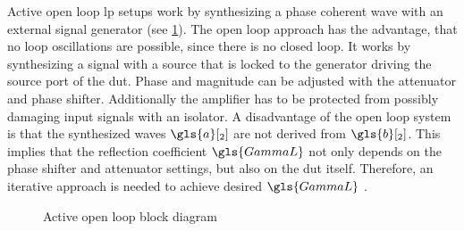 \documentclass[12pt,a4paper,parskip=full,abstract=true,BCOR=12mm]{scrreprt}
\begin{document}
Active open loop \gls{lp} setups work by synthesizing a phase coherent wave with
an external signal generator (see \cref{fig:active_open_loop}). The open loop
approach has the advantage, that no loop oscillations are possible, since there is no closed loop.
It works by synthesizing a signal with a source that is locked to the generator driving the
source port of the \gls{dut}. Phase and magnitude can be adjusted with the attenuator and
phase shifter. Additionally the amplifier has to be protected from possibly damaging input signals
with an isolator. A disadvantage of the open loop system is that the synthesized waves $\gls{a}[_2]$ are
not derived from $\gls{b}[_2]$. This implies that the reflection coefficient $\gls{GammaL}$ not only
depends on the phase shifter and attenuator settings, but also on the \gls{dut} itself.
Therefore, an iterative approach is needed to achieve desired $\gls{GammaL}$ \cite{muller_comparison_1994}.

\begin{figure}[htb]
    \centering
    \caption{Active open loop  block diagram}
    \label{fig:active_open_loop}
\end{figure}
\end{document}
